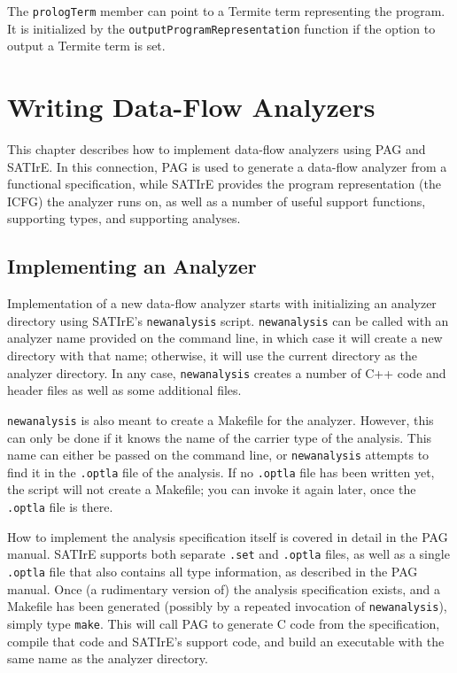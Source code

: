 \documentclass[a4paper,12pt]{report}
\begin{document}
The \texttt{prologTerm} member can point to a Termite term representing the
program. It is initialized by the \texttt{outputProgramRepresentation}
function if the option to output a Termite term is set.

\chapter{Writing Data-Flow Analyzers}
\label{chap:data_flow}

This chapter describes how to implement data-flow analyzers using PAG and
SATIrE. In this connection, PAG is used to generate a data-flow analyzer
from a functional specification, while SATIrE provides the program
representation (the ICFG) the analyzer runs on, as well as a number of
useful support functions, supporting types, and supporting analyses.

\section{Implementing an Analyzer}
\label{sec:pag_analyzer}

Implementation of a new data-flow analyzer starts with initializing an
analyzer directory using SATIrE's \texttt{newanalysis} script.
\texttt{newanalysis} can be called with an analyzer name provided on the
command line, in which case it will create a new directory with that name;
otherwise, it will use the current directory as the analyzer directory. In
any case, \texttt{newanalysis} creates a number of C++ code and header files
as well as some additional files.

\texttt{newanalysis} is also meant to create a Makefile for the analyzer.
However, this can only be done if it knows the name of the carrier type of
the analysis. This name can either be passed on the command line, or
\texttt{newanalysis} attempts to find it in the \texttt{.optla} file of the
analysis. If no \texttt{.optla} file has been written yet, the script will
not create a Makefile; you can invoke it again later, once the
\texttt{.optla} file is there.

How to implement the analysis specification itself is covered in detail in
the PAG manual. SATIrE supports both separate \texttt{.set} and
\texttt{.optla} files, as well as a single \texttt{.optla} file that also
contains all type information, as described in the PAG manual. Once (a
rudimentary version of) the analysis specification exists, and a Makefile
has been generated (possibly by a repeated invocation of
\texttt{newanalysis}), simply type \verb|make|. This will call PAG to
generate C code from the specification, compile that code and SATIrE's
support code, and build an executable with the same name as the analyzer
directory.
\end{document}
